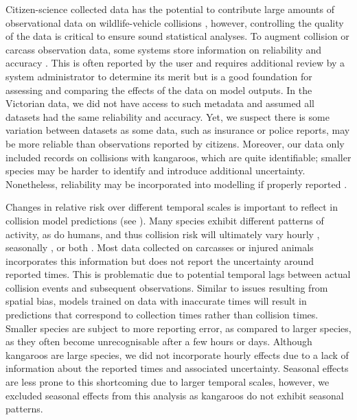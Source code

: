 Citizen-science collected data has the potential to contribute large amounts of observational data on wildlife-vehicle collisions \citep{cose14,dwye16,paul14}, however, controlling the quality of the data is critical to ensure sound statistical analyses. To augment collision or carcass observation data, some systems store information on reliability and accuracy \citep[e.g.][]{shil15a}. This is often reported by the user and requires additional review by a system administrator to determine its merit but is a good foundation for assessing and comparing the effects of the data on model outputs. In the Victorian data, we did not have access to such metadata and assumed all datasets had the same reliability and accuracy. Yet, we suspect there is some variation between datasets as some data, such as insurance or police reports, may be more reliable than observations reported by citizens. Moreover, our data only included records on collisions with kangaroos, which are quite identifiable; smaller species may be harder to identify and introduce additional uncertainty. Nonetheless, reliability may be incorporated into modelling if properly reported \citep{guns09}.

Changes in relative risk over different temporal scales is important to reflect in collision model predictions (see ). Many species exhibit different patterns of activity, as do humans, and thus collision risk will ultimately vary hourly \citep{joyc01}, seasonally \citep{alve12,beau10,gril09}, or both \citep{mizu14,more13}. Most data collected on carcasses or injured animals incorporates this information but does not report the uncertainty around reported times. This is problematic due to potential temporal lags between actual collision events and subsequent observations. Similar to issues resulting from spatial bias, models trained on data with inaccurate times will result in predictions that correspond to collection times rather than collision times. Smaller species are subject to more reporting error, as compared to larger species, as they often become unrecognisable after a few hours or days. Although kangaroos are large species, we did not incorporate hourly effects due to a lack of information about the reported times and associated uncertainty. Seasonal effects are less prone to this shortcoming due to larger temporal scales, however, we excluded seasonal effects from this analysis as kangaroos do not exhibit seasonal patterns. 

